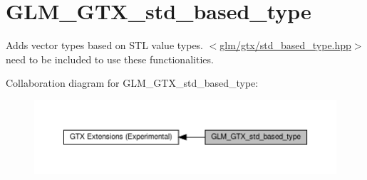 \hypertarget{group__gtx__std__based__type}{}\section{G\+L\+M\+\_\+\+G\+T\+X\+\_\+std\+\_\+based\+\_\+type}
\label{group__gtx__std__based__type}


Adds vector types based on S\+TL value types. $<$\hyperlink{std__based__type_8hpp}{glm/gtx/std\+\_\+based\+\_\+type.\+hpp}$>$ need to be included to use these functionalities.  


Collaboration diagram for G\+L\+M\+\_\+\+G\+T\+X\+\_\+std\+\_\+based\+\_\+type\+:\nopagebreak
\begin{figure}[H]
\begin{center}
\leavevmode
\includegraphics[width=350pt]{group__gtx__std__based__type}
\end{center}
\end{figure}
